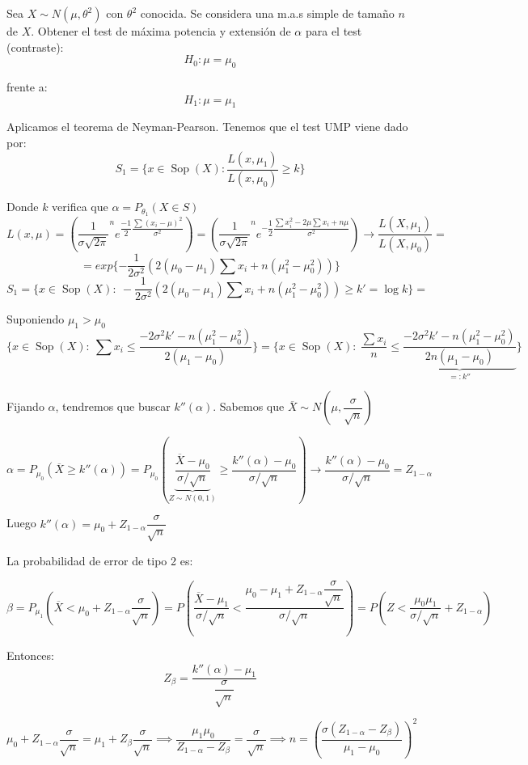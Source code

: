 \documentclass[openany]{book}
\begin{document}
\begin{example}
    Sea $ X \sim N(\mu, \theta^2) $ con $ \theta^2 $ conocida. Se considera una m.a.s simple de tamaño $ n $ de $ X $. Obtener el test de máxima potencia y extensión de $ \alpha $ para el test (contraste):
    $$ H_0: \mu = \mu_0 $$

    frente a:
    $$ H_1: \mu = \mu_1 $$

    Aplicamos el teorema de Neyman-Pearson. Tenemos que el test UMP viene dado por:
    $$ S_1 = \{x \in \operatorname{Sop}(X):  \dfrac{L(x,\mu_1)}{L(x,\mu_0)}\geq  k \} $$
    
    Donde $ k $ verifica que $ \alpha = P_{\theta_1}(X \in S) $
    $$ L(x,\mu) = \left( \dfrac{1}{\sigma \sqrt{2\pi}}^{n} e^{\dfrac{-1}{2}\dfrac{\sum (x_i-\mu)^2}{\sigma^2}} \right) = \left( \dfrac{1}{\sigma\sqrt{2\pi}}^{n}e^{-\dfrac{1}{2} \dfrac{\sum x_i^2-2\mu\sum x_i+n\mu}{\sigma^2}}  \right) \to \dfrac{L(X,\mu_1)}{L(X,\mu_0)} = $$ 
    $$ =exp \{-\dfrac{1}{2\sigma ^2}(2(\mu_0-\mu_1)\sum x_i+n(\mu_1^2-\mu_0^2))\} $$
    $$ S_1 = \{x \in \operatorname{Sop}(X):\ -\dfrac{1}{2\sigma ^2}(2(\mu_0-\mu_1)\sum x_i + n(\mu_1^2-\mu_0^2)) \geq  k' = \log{k}\} =$$ 
    
    Suponiendo $ \mu_1>\mu_0 $
    $$ \{x \in \operatorname{Sop}(X):\ \sum x_i \leq  \dfrac{-2\sigma^2k'-n(\mu_1^2-\mu_0^2)}{2(\mu_1-\mu_0)} \} = \{x \in \operatorname{Sop}(X):\ \dfrac{\sum x_i}{n} \leq  \underbrace{\dfrac{-2\sigma^2k'-n(\mu_1^2-\mu_0^2)}{2n(\mu_1-\mu_0)}}_{=:k''} \} $$

    Fijando $ \alpha $, tendremos que buscar $ k''(\alpha) $. Sabemos que $ \overline{X} \sim N\left(\mu,\dfrac{\sigma}{\sqrt{n}}\right) $

    $$ \alpha = P_{\mu_0}\left(\overline{X} \geq  k''(\alpha)\right) = P_{\mu_0} \left(\underbrace{\dfrac{\overline{X}-\mu_0}{\sigma/\sqrt{n}}}_{Z \sim N(0,1)} \geq  \dfrac{k''(\alpha)-\mu_0}{\sigma/\sqrt{n}}\right) \to \dfrac{k''(\alpha)-\mu_0}{\sigma/\sqrt{n}} = Z_{1-\alpha} $$

    Luego $ k''(\alpha) = \mu_0 + Z_{1-\alpha} \dfrac{\sigma}{\sqrt{n}} $

    La probabilidad de error de tipo 2 es:

    $$ \beta = P_{\mu_1} (\overline{X} < \mu_0+Z_{1-\alpha}\dfrac{\sigma}{\sqrt{n}}) = P \left( \dfrac{\overline{X}-\mu_1}{\sigma/\sqrt{n}}< \dfrac{\mu_0-\mu_1+Z_{1-\alpha}\dfrac{\sigma}{\sqrt{n}}}{\sigma/\sqrt{n}}\right) = P\left(Z < \dfrac{\mu_0\mu_1}{\sigma/\sqrt{n}}+Z_{1-\alpha}\right)  $$

    Entonces:
    $$ Z_{\beta} = \dfrac{k''(\alpha)-\mu_1}{\dfrac{\sigma}{\sqrt{n}}} $$

    $$ \mu_0+Z_{1-\alpha} \dfrac{\sigma}{\sqrt{n}} = \mu_1 + Z_{\beta} \dfrac{\sigma}{\sqrt{n}} \implies \dfrac{\mu_1\mu_0}{Z_{1-\alpha}-Z_{\beta}} = \dfrac{\sigma}{\sqrt{n}} \implies n = \left( \dfrac{\sigma (Z_{1-\alpha}-Z_{\beta})}{\mu_1-\mu_0} \right)^2 $$



    
\end{example}
\end{document}
